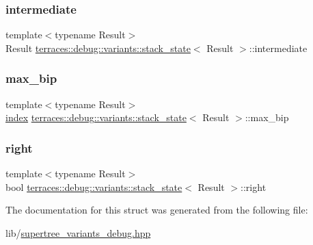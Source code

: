 \subsubsection{\texorpdfstring{intermediate}{intermediate}}
{\footnotesize\ttfamily template$<$typename Result$>$ \\
Result \hyperlink{structterraces_1_1debug_1_1variants_1_1stack__state}{terraces\+::debug\+::variants\+::stack\+\_\+state}$<$ Result $>$\+::intermediate}

\mbox{\label{structterraces_1_1debug_1_1variants_1_1stack__state_aed75425f1d76ae6bec3e9a733bf8de9d}} 
\subsubsection{\texorpdfstring{max\+\_\+bip}{max\_bip}}
{\footnotesize\ttfamily template$<$typename Result$>$ \\
\hyperlink{namespaceterraces_adbc33ccb543d1634e96d0eb02e472c77}{index} \hyperlink{structterraces_1_1debug_1_1variants_1_1stack__state}{terraces\+::debug\+::variants\+::stack\+\_\+state}$<$ Result $>$\+::max\+\_\+bip}

\mbox{\label{structterraces_1_1debug_1_1variants_1_1stack__state_a3b6c53beae52fe9d9afce640c6ea08e4}} 
\subsubsection{\texorpdfstring{right}{right}}
{\footnotesize\ttfamily template$<$typename Result$>$ \\
bool \hyperlink{structterraces_1_1debug_1_1variants_1_1stack__state}{terraces\+::debug\+::variants\+::stack\+\_\+state}$<$ Result $>$\+::right}



The documentation for this struct was generated from the following file\+:\begin{DoxyCompactItemize}
\item 
lib/\hyperlink{supertree__variants__debug_8hpp}{supertree\+\_\+variants\+\_\+debug.\+hpp}\end{DoxyCompactItemize}
